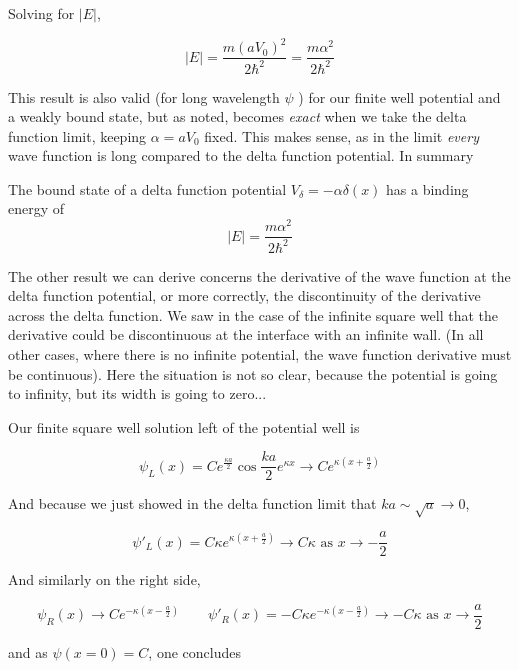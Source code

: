 Solving for $|E|$, 

\[
|E| = \frac{m(aV_0)^2}{2\hbar^2} = \frac{m\alpha^2}{2\hbar^2}
\] \vspace{3px}

This result is also valid (for long wavelength $\psi$ ) for our finite well
potential and a weakly bound state, but as noted, becomes \textit{exact} when
we take the delta function limit, keeping $\alpha = aV_0$ fixed. This makes
sense, as in the limit \textit{every} wave function is long compared to the
delta function potential. In summary 


\begin{mainbox}{}
  The bound state of a delta function potential $V_\delta = -\alpha \delta(x)$
  has a binding energy of 
  \[ |E| = \frac{m\alpha^2}{2\hbar^2} \]
\end{mainbox}

The other result we can derive concerns the derivative of the wave function at
the delta function potential,
or more correctly, the discontinuity of the derivative across the delta function. We saw in the case
of the infinite square well that the derivative could be discontinuous at the
interface with an infinite wall. (In all other cases, where there is no
infinite potential, the wave function derivative must be
continuous). Here the situation is not so clear, because the potential is going to infinity, but its
width is going to zero...

Our finite square well solution left of the potential well is 

\[
  \psi_L (x) = Ce^{\frac{\kappa a}{2}} \cos \frac{ka}{2} e^{\kappa x}
  \rightarrow Ce^{\kappa\left( x + \frac{a}{2} \right) } 
\] \vspace{3px}


And because we just showed in the delta function limit that $ka \sim \sqrt{a}
\rightarrow 0$, 

\[
  \psi'_L(x) = C\kappa e^{\kappa \left( x + \frac{a}{2} \right)} \rightarrow
  C\kappa \text{ as } x \rightarrow -\frac{a}{2}
\] \vspace{3px}

And similarly on the right side, 

\[
  \psi_R(x) \rightarrow Ce^{-\kappa \left( x - \frac{a}{2} \right) } \qquad
  \psi'_R(x) = -C\kappa e^{-\kappa \left( x - \frac{a}{2} \right) } \rightarrow
  -C\kappa \text{ as } x \rightarrow \frac{a}{2}
\] \vspace{3px}

and as $\psi(x = 0) = C$, one concludes

